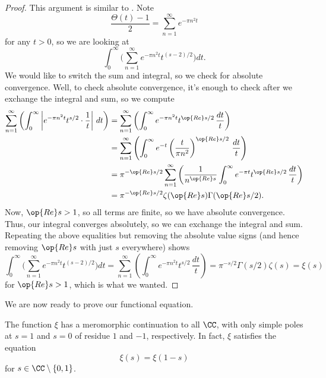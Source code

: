 \documentclass[../notes.tex]{subfiles}
\begin{document}
\begin{proof}
	This argument is similar to . Note
	\[\frac{\Theta(t)-1}2=\sum_{n=1}^\infty e^{-\pi n^2t}\]
	for any $t>0$, so we are looking at
	\[\int_0^\infty\Bigg(\sum_{n=1}^\infty e^{-\pi n^2t}t^{(s-2)/2}\Bigg)dt.\]
	We would like to switch the sum and integral, so we check for absolute convergence. Well, to check absolute convergence, it's enough to check after we exchange the integral and sum, so we compute
	\begin{align*}
		\sum_{n=1}^\infty\left(\int_0^\infty\left|e^{-\pi n^2t}t^{s/2}\cdot\frac1t\right|\,dt\right) &= \sum_{n=1}^\infty\left(\int_0^\infty e^{-\pi n^2t}t^{\op{Re}s/2}\,\frac{dt}t\right) \\
		&= \sum_{n=1}^\infty\left(\int_0^\infty e^{-t}\left(\frac t{\pi n^2}\right)^{\op{Re}s/2}\,\frac{dt}t\right) \\
		&= \pi^{-\op{Re}s/2}\sum_{n=1}^\infty\left(\frac1{n^{\op{Re}s}}\int_0^\infty e^{-\pi t}t^{\op{Re}s/2}\,\frac{dt}t\right) \\
		&= \pi^{-\op{Re}s/2}\zeta(\op{Re}s)\Gamma(\op{Re}s/2).
	\end{align*}
	Now, $\op{Re}s>1$, so all terms are finite, so we have absolute convergence. Thus, our integral converges absolutely, so we can exchange the integral and sum. Repeating the above equalities but removing the absolute value signs (and hence removing $\op{Re}s$ with just $s$ everywhere) shows
	\[\int_0^\infty\Bigg(\sum_{n=1}^\infty e^{-\pi n^2t}t^{(s-2)/2}\Bigg)dt=\sum_{n=1}^\infty\left(\int_0^\infty e^{-\pi n^2t}t^{s/2}\,\frac{dt}t\right)=\pi^{-s/2}\Gamma(s/2)\zeta(s)=\xi(s)\]
	for $\op{Re}s>1$, which is what we wanted.
\end{proof}
We are now ready to prove our functional equation.
\begin{theorem} \label{thm:xi-func-eq}
	The function $\xi$ has a meromorphic continuation to all $\CC$, with only simple poles at $s=1$ and $s=0$ of residue $1$ and $-1$, respectively. In fact, $\xi$ satisfies the equation
	\[\xi(s)=\xi(1-s)\]
	for $s\in\CC\setminus\{0,1\}$.
\end{theorem}
\end{document}

